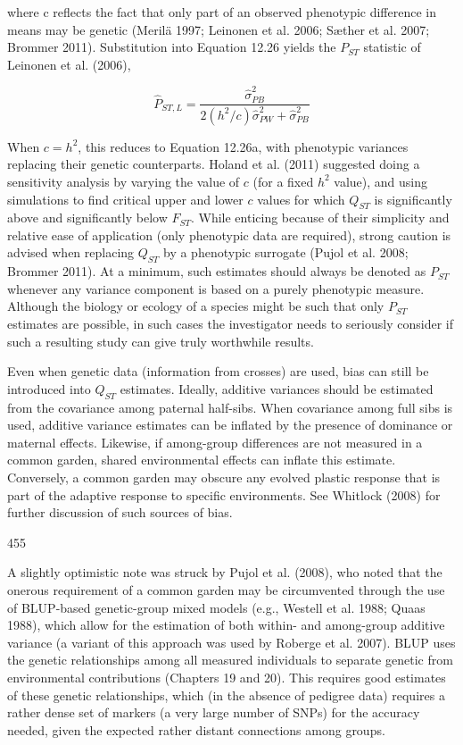 \documentclass{article}
\begin{document}
where c reflects the fact that only part of an observed phenotypic difference in means may be genetic (Merilä 1997; Leinonen et al. 2006; Sæther et al. 2007; Brommer 2011). Substitution into Equation 12.26 yields the  $ P_{ST} $ statistic of Leinonen et al. (2006),

\begin{equation}
\widehat{P}_{ST,L}=\frac{\widehat{\sigma}_{PB}^{2}}{2(h^{2}/c)\widehat{\sigma}_{PW}^{2}+\widehat{\sigma}_{PB}^{2}}
\tag{12.27b}
\label{eq:12_27b}
\end{equation}

When  $ c = h^2 $, this reduces to Equation 12.26a, with phenotypic variances replacing their genetic counterparts. Holand et al. (2011) suggested doing a sensitivity analysis by varying the value of  $ c $ (for a fixed  $ h^2 $ value), and using simulations to find critical upper and lower  $ c $ values for which  $ Q_{ST} $ is significantly above and significantly below  $ F_{ST} $. While enticing because of their simplicity and relative ease of application (only phenotypic data are required), strong caution is advised when replacing  $ Q_{ST} $ by a phenotypic surrogate (Pujol et al. 2008; Brommer 2011). At a minimum, such estimates should always be denoted as  $ P_{ST} $ whenever any variance component is based on a purely phenotypic measure. Although the biology or ecology of a species might be such that only  $ P_{ST} $ estimates are possible, in such cases the investigator needs to seriously consider if such a resulting study can give truly worthwhile results.

Even when genetic data (information from crosses) are used, bias can still be introduced into  $ Q_{ST} $ estimates. Ideally, additive variances should be estimated from the covariance among paternal half-sibs. When covariance among full sibs is used, additive variance estimates can be inflated by the presence of dominance or maternal effects. Likewise, if among-group differences are not measured in a common garden, shared environmental effects can inflate this estimate. Conversely, a common garden may obscure any evolved plastic response that is part of the adaptive response to specific environments. See Whitlock (2008) for further discussion of such sources of bias.

455

A slightly optimistic note was struck by Pujol et al. (2008), who noted that the onerous requirement of a common garden may be circumvented through the use of BLUP-based genetic-group mixed models (e.g., Westell et al. 1988; Quaas 1988), which allow for the estimation of both within- and among-group additive variance (a variant of this approach was used by Roberge et al. 2007). BLUP uses the genetic relationships among all measured individuals to separate genetic from environmental contributions (Chapters 19 and 20). This requires good estimates of these genetic relationships, which (in the absence of pedigree data) requires a rather dense set of markers (a very large number of SNPs) for the accuracy needed, given the expected rather distant connections among groups.
\end{document}
